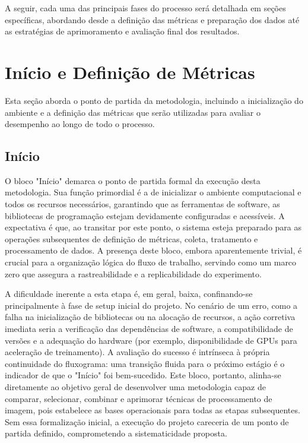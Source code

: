 A seguir, cada uma das principais fases do processo será detalhada em seções específicas, abordando desde a definição das métricas e preparação dos dados até as estratégias de aprimoramento e avaliação final dos resultados.

\section{Início e Definição de Métricas}

Esta seção aborda o ponto de partida da metodologia, incluindo a inicialização do ambiente e a definição das métricas que serão utilizadas para avaliar o desempenho ao longo de todo o processo.

\subsection{Início}
O bloco "Início" demarca o ponto de partida formal da execução desta metodologia. Sua função primordial é a de inicializar o ambiente computacional e todos os recursos necessários, garantindo que as ferramentas de software, as bibliotecas de programação estejam devidamente configuradas e acessíveis. A expectativa é que, ao transitar por este ponto, o sistema esteja preparado para as operações subsequentes de definição de métricas, coleta, tratamento e processamento de dados. A presença deste bloco, embora aparentemente trivial, é crucial para a organização lógica do fluxo de trabalho, servindo como um marco zero que assegura a rastreabilidade e a replicabilidade do experimento.

A dificuldade inerente a esta etapa é, em geral, baixa, confinando-se principalmente à fase de setup inicial do projeto. No cenário de um erro, como a falha na inicialização de bibliotecas ou na alocação de recursos, a ação corretiva imediata seria a verificação das dependências de software, a compatibilidade de versões e a adequação do hardware (por exemplo, disponibilidade de GPUs para aceleração de treinamento). A avaliação do sucesso é intrínseca à própria continuidade do fluxograma: uma transição fluida para o próximo estágio é o indicador de que o "Início" foi bem-sucedido. Este bloco, portanto, alinha-se diretamente ao objetivo geral de desenvolver uma metodologia capaz de comparar, selecionar, combinar e aprimorar técnicas de processamento de imagem, pois estabelece as bases operacionais para todas as etapas subsequentes. Sem essa formalização inicial, a execução do projeto careceria de um ponto de partida definido, comprometendo a sistematicidade proposta.

